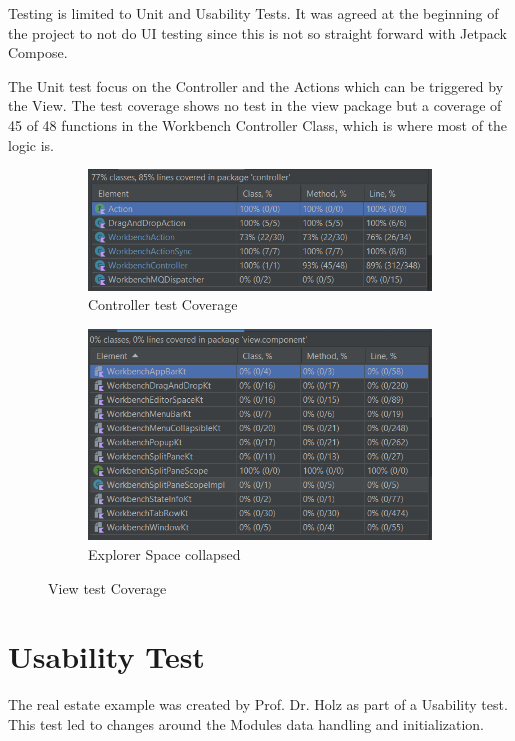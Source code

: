 Testing is limited to Unit and Usability Tests. It was agreed at the beginning of the project to not do UI testing since this is not so straight forward with Jetpack Compose. 

The Unit test focus on the Controller and the Actions which can be triggered by the View. The test coverage shows no test in the view package but a coverage of 45 of 48 functions in the Workbench Controller Class, which is where most of the logic is.

\begin{figure}[H]
\centering
\begin{subfigure}{.5\textwidth}
  \centering
  \includegraphics[width=.9\linewidth]{images/TestCoverageControllerPackage}
  \caption{Controller test Coverage}
  \label{fig:ransac_result}
\end{subfigure}%
\begin{subfigure}{.5\textwidth}
  \centering
  \includegraphics[width=.9\linewidth]{images/TestCoverageViewPackage.PNG}
  \caption{Explorer Space collapsed}
  \label{fig:ransac_rotation}
\end{subfigure}
\caption{View test Coverage}
\label{fig:ransac_results}
\end{figure}

\section{Usability Test}
The real estate example was created by Prof. Dr. Holz as part of a Usability test. This test led to changes around the Modules data handling and initialization.